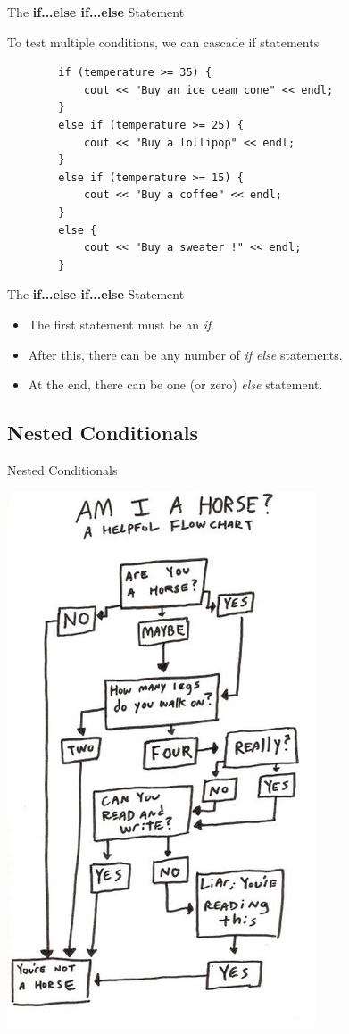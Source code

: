 \begin{frame}[fragile]{The \textbf{if...else if...else} Statement}{}
    \begin{block}{}
        To test multiple conditions, we can cascade if statements
    \end{block}
    \begin{verbatim}
        if (temperature >= 35) {
            cout << "Buy an ice ceam cone" << endl;
        }
        else if (temperature >= 25) {
            cout << "Buy a lollipop" << endl;
        }
        else if (temperature >= 15) {
            cout << "Buy a coffee" << endl;
        }
        else {
            cout << "Buy a sweater !" << endl;
        }
    \end{verbatim}
\end{frame}

\begin{frame}[fragile]{The \textbf{if...else if...else} Statement}{}
    \begin{itemize}
        \item The first statement must be an \emph{if}.
        \item After this, there can be any number of \emph{if else} statements. 
        \item At the end, there can be one (or zero) \emph{else} statement. 
    \end{itemize}
\end{frame}

\subsection{Nested Conditionals}
\begin{frame}[fragile]{Nested Conditionals}{}
    \begin{center}
        \includegraphics[width=.4\linewidth]{images/horse.jpg}
    \end{center}
\end{frame}

